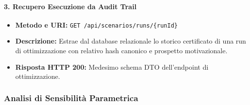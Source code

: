 \paragraph{3. Recupero Esecuzione da Audit Trail}
\begin{itemize}[leftmargin=1.4em, itemsep=0.1em]
    \item \textbf{Metodo e URI:} \texttt{GET /api/scenarios/runs/\{runId\}}
    \item \textbf{Descrizione:} Estrae dal database relazionale lo storico certificato di una run di ottimizzazione con relativo hash canonico e prospetto motivazionale.
    \item \textbf{Risposta HTTP 200:} Medesimo schema DTO dell'endpoint di ottimizzazione.
\end{itemize}

\subsubsection{Analisi di Sensibilità Parametrica}

